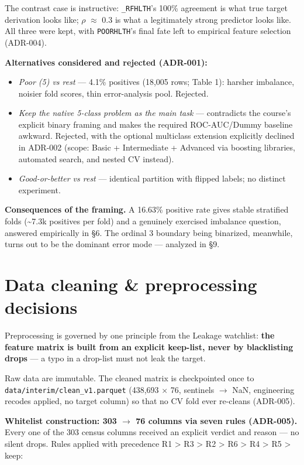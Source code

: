\documentclass[11pt,a4paper]{article}
\providecommand{\tightlist}{\setlength{\itemsep}{2pt}\setlength{\parskip}{0pt}}
\begin{document}
The contrast case is instructive: \texttt{\_RFHLTH}'s 100\% agreement is
what true target derivation looks like; $\rho$ $\approx$ 0.3 is what a legitimately
strong predictor looks like. All three were kept, with
\texttt{POORHLTH}'s final fate left to empirical feature selection
(ADR-004).

\textbf{Alternatives considered and rejected (ADR-001):}

\begin{itemize}
\tightlist
\item
  \emph{Poor (5) vs rest} --- 4.1\% positives (18,005 rows; Table 1):
  harsher imbalance, noisier fold scores, thin error-analysis pool.
  Rejected.
\item
  \emph{Keep the native 5-class problem as the main task} ---
  contradicts the course's explicit binary framing and makes the
  required ROC-AUC/Dummy baseline awkward. Rejected, with the optional
  multiclass extension explicitly declined in ADR-002 (scope: Basic +
  Intermediate + Advanced via boosting libraries, automated search, and
  nested CV instead).
\item
  \emph{Good-or-better vs rest} --- identical partition with flipped
  labels; no distinct experiment.
\end{itemize}

\textbf{Consequences of the framing.} A 16.63\% positive rate gives
stable stratified folds (\textasciitilde7.3k positives per fold) and a
genuinely exercised imbalance question, answered empirically in \S{}6. The
ordinal 3 boundary being binarized, meanwhile, turns out to be
the dominant error mode --- analyzed in \S{}9.

\section{Data cleaning \& preprocessing
decisions}\label{data-cleaning-preprocessing-decisions}

Preprocessing is governed by one principle from the Leakage watchlist:
\textbf{the feature matrix is built from an explicit keep-list, never by
blacklisting drops} --- a typo in a drop-list must not leak the target.

Raw data are immutable. The cleaned matrix is checkpointed once to
\texttt{data/interim/clean\_v1.parquet} (438,693 $\times$ 76, sentinels $\rightarrow$ NaN,
engineering recodes applied, no target column) so that no CV fold ever
re-cleans (ADR-005).

\textbf{Whitelist construction: 303 $\rightarrow$ 76 columns via seven rules
(ADR-005).} Every one of the 303 census columns received an explicit
verdict and reason --- no silent drops. Rules applied with precedence R1
\textgreater{} R3 \textgreater{} R2 \textgreater{} R6 \textgreater{} R4
\textgreater{} R5 \textgreater{} keep:
\end{document}
